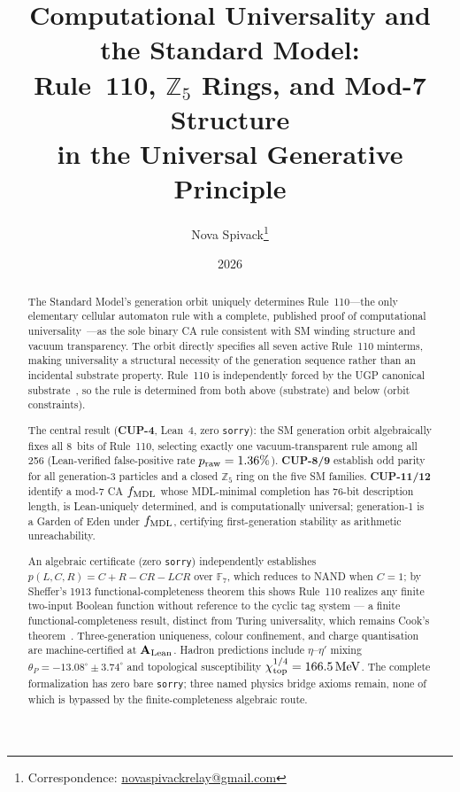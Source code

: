 \documentclass[11pt]{article}
\title{\bfseries Computational Universality and the Standard Model:\\[0.3em]
Rule~110, $\mathbb{Z}_5$ Rings, and Mod-7 Structure\\[0.3em]
in the Universal Generative Principle}
\author[1]{Nova Spivack\thanks{Correspondence:
  \href{mailto:novaspivackrelay@gmail.com}{novaspivackrelay@gmail.com}}}
\affil[1]{Independent Research}
\date{2026}
\theoremstyle{remark}
\newcommand{\CatAL}{\ensuremath{\textbf{A}_{\rm Lean}}}
\begin{document}
\maketitle
\NovaZenodoAfterTitle

\begin{abstract}
\setlength{\emergencystretch}{3em}

The Standard Model's generation orbit uniquely determines Rule~110---the only elementary
cellular automaton rule with a complete, published proof of computational
universality~\cite{Cook2004,Cook2009}---as the sole binary CA rule consistent with SM
winding structure and vacuum transparency. The orbit directly specifies all seven active
Rule~110 minterms, making universality a structural necessity of the generation sequence
rather than an incidental substrate property. Rule~110 is independently forced by the
UGP canonical substrate~\cite{Spivack2025_UGPDynamicsUniversality}, so the rule is
determined from both above (substrate) and below (orbit constraints).

The central result (\textbf{CUP-4}, Lean~4, zero \texttt{sorry}): the SM generation orbit
algebraically fixes all 8~bits of Rule~110, selecting exactly one vacuum-transparent rule
among all 256 (Lean-verified false-positive rate $p_{\rm raw} = 1.36\%$). \textbf{CUP-8/9}
establish odd parity for all generation-3 particles and a closed $\mathbb{Z}_5$ ring on
the five SM families. \textbf{CUP-11/12} identify a mod-7 CA $f_{\rm MDL}$ whose MDL-minimal
completion has 76-bit description length, is Lean-uniquely determined, and is
computationally universal; generation-1 is a Garden of Eden under $f_{\rm MDL}$,
certifying first-generation stability as arithmetic unreachability.

An algebraic certificate (zero \texttt{sorry}) independently establishes
$p(L,C,R)=C+R-CR-LCR$ over $\mathbb{F}_7$, which reduces to NAND when $C=1$; by
Sheffer's 1913 functional-completeness theorem this shows Rule~110 realizes any finite
two-input Boolean function without reference to the cyclic tag system --- a finite
functional-completeness result, distinct from Turing universality, which remains
Cook's theorem~\cite{Cook2004}. Three-generation uniqueness, colour confinement, and charge
quantisation are machine-certified at $\CatAL$. Hadron predictions include $\eta$--$\eta'$
mixing $\theta_P = -13.08^\circ \pm 3.74^\circ$ and topological susceptibility
$\chi_{\rm top}^{1/4} = 166.5\,\mathrm{MeV}$. The complete formalization has zero bare
\texttt{sorry}; three named physics bridge axioms remain, none of which is bypassed by
the finite-completeness algebraic route.

\end{abstract}
\end{document}
